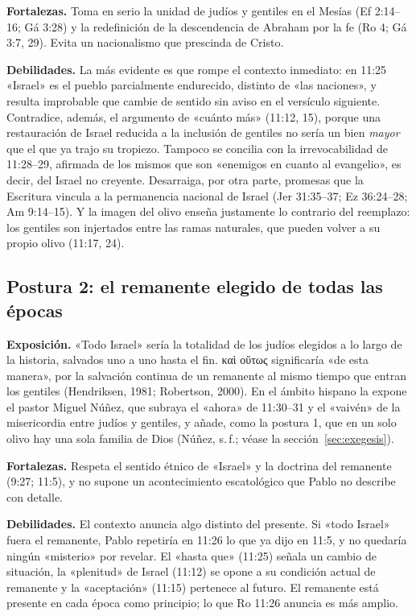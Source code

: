 \documentclass[11pt,letterpaper]{article}
\newcommand{\grc}[1]{\foreignlanguage{ancientgreek}{#1}}
\begin{document}
\textbf{Fortalezas.} Toma en serio la unidad de judíos y gentiles en el Mesías (Ef 2:14--16; Gá 3:28) y la redefinición de la descendencia de Abraham por la fe (Ro 4; Gá 3:7, 29). Evita un nacionalismo que prescinda de Cristo.

\textbf{Debilidades.} La más evidente es que rompe el contexto inmediato: en 11:25 «Israel» es el pueblo parcialmente endurecido, distinto de «las naciones», y resulta improbable que cambie de sentido sin aviso en el versículo siguiente. Contradice, además, el argumento de «cuánto más» (11:12, 15), porque una restauración de Israel reducida a la inclusión de gentiles no sería un bien \emph{mayor} que el que ya trajo su tropiezo. Tampoco se concilia con la irrevocabilidad de 11:28--29, afirmada de los mismos que son «enemigos en cuanto al evangelio», es decir, del Israel no creyente. Desarraiga, por otra parte, promesas que la Escritura vincula a la permanencia nacional de Israel (Jer 31:35--37; Ez 36:24--28; Am 9:14--15). Y la imagen del olivo enseña justamente lo contrario del reemplazo: los gentiles son injertados entre las ramas naturales, que pueden volver a su propio olivo (11:17, 24).

\subsection{Postura 2: el remanente elegido de todas las épocas}
\textbf{Exposición.} «Todo Israel» sería la totalidad de los judíos elegidos a lo largo de la historia, salvados uno a uno hasta el fin. \grc{καὶ οὕτως} significaría «de esta manera», por la salvación continua de un remanente al mismo tiempo que entran los gentiles (Hendriksen, 1981; Robertson, 2000). En el ámbito hispano la expone el pastor Miguel Núñez, que subraya el «ahora» de 11:30--31 y el «vaivén» de la misericordia entre judíos y gentiles, y añade, como la postura 1, que en un solo olivo hay una sola familia de Dios (Núñez, s.\,f.; véase la sección~\ref{sec:exegesis}).

\textbf{Fortalezas.} Respeta el sentido étnico de «Israel» y la doctrina del remanente (9:27; 11:5), y no supone un acontecimiento escatológico que Pablo no describe con detalle.

\textbf{Debilidades.} El contexto anuncia algo distinto del presente. Si «todo Israel» fuera el remanente, Pablo repetiría en 11:26 lo que ya dijo en 11:5, y no quedaría ningún «misterio» por revelar. El «hasta que» (11:25) señala un cambio de situación, la «plenitud» de Israel (11:12) se opone a su condición actual de remanente y la «aceptación» (11:15) pertenece al futuro. El remanente está presente en cada época como principio; lo que Ro 11:26 anuncia es más amplio.
\end{document}
